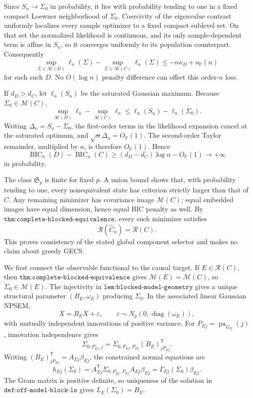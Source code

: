 Since \(S_n\to\Sigma_0\) in probability, it lies with probability tending to one in a fixed compact Loewner neighborhood of \(\Sigma_0\). Coercivity of the eigenvalue contrast uniformly localizes every sample optimizer to a fixed compact sublevel set. On that set the normalized likelihood is continuous, and its only sample-dependent term is affine in \(S_n\), so it converges uniformly to its population counterpart. Consequently
\[
 \sup_{\Sigma\in\mathcal M(D)}\ell_n(\Sigma)
 -\sup_{\Sigma\in\mathcal M(C)}\ell_n(\Sigma)
 \leq -n\kappa_D+o_{\mathbb P}(n)
\]
for each such \(D\). No \(O(\log n)\) penalty difference can offset this order-\(n\) loss.

If \(d_D>d_C\), let \(\ell_n(S_n)\) be the saturated Gaussian maximum. Because \(\Sigma_0\in\mathcal M(C)\),
\[
 \sup_{\mathcal M(D)}\ell_n-\sup_{\mathcal M(C)}\ell_n
 \leq \ell_n(S_n)-\ell_n(\Sigma_0).
\]
Writing \(\Delta_n=S_n-\Sigma_0\), the first-order terms in the likelihood expansion cancel at the saturated optimum, and \(\sqrt n\Delta_n=O_{\mathbb P}(1)\). The second-order Taylor remainder, multiplied by \(n\), is therefore \(O_{\mathbb P}(1)\). Hence
\[
 \operatorname{BIC}_n(D)-\operatorname{BIC}_n(C)
 \geq(d_D-d_C)\log n-O_{\mathbb P}(1)
 \longrightarrow+\infty
\]
in probability.

The class \(\mathfrak S_p\) is finite for fixed \(p\). A union bound shows that, with probability tending to one, every nonequivalent state has criterion strictly larger than that of \(C\). Any remaining minimizer has covariance image \(\mathcal M(C)\); equal embedded images have equal dimension, hence equal BIC penalty as well. By \(\texttt{thm:complete-blocked-equivalence}\), every such minimizer satisfies
\[
 \mathcal R(\widehat C_n)=\mathcal R(C).
\]
This proves consistency of the stated global component selector and makes no claim about greedy GECS.

We first connect the observable functional to the causal target. If \(E\in\mathcal R(C)\), then \(\texttt{thm:complete-blocked-equivalence}\) gives \(\mathcal M(E)=\mathcal M(C)\), so \(\Sigma_0\in\mathcal M(E)\). The injectivity in \(\texttt{lem:blocked-model-geometry}\) gives a unique structural parameter \((B_E,\omega_E)\) producing \(\Sigma_0\). In the associated linear Gaussian NPSEM,
\[
 X=B_EX+\varepsilon,
 \qquad \varepsilon\sim N_p(0,\operatorname{diag}(\omega_E)),
\]
with mutually independent innovations of positive variance. For \(P_{Ej}=\operatorname{pa}_{G_E}(j)\), innovation independence gives
\[
 \Sigma_{0,P_{Ej},j}
 =\Sigma_{0,P_{Ej},P_{Ej}}(B_E)_{jP_{Ej}}^{\mathsf T}.
\]
Writing \((B_E)_{jP_{Ej}}^{\mathsf T}=A_{Ej}\beta_{Ej}\), the constrained normal equations are
\[
 h_{Ej}(\Sigma_0)
 =A_{Ej}^{\mathsf T}\Sigma_{0,P_{Ej},P_{Ej}}A_{Ej}\beta_{Ej}
 =\Gamma_{Ej}(\Sigma_0)\beta_{Ej}.
\]
The Gram matrix is positive definite, so uniqueness of the solution in \(\texttt{def:off-model-block-ls}\) gives \(L_E(\Sigma_0)=B_E\).

